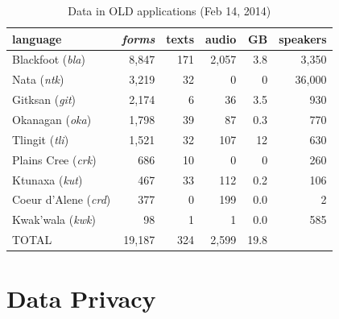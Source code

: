 \documentclass[11pt]{article}
\begin{document}
\begin{table}[h]
 \begin{center}
     \scriptsize
\begin{tabular}{lrrrrr}

      \toprule
      language &                     \emph{forms}  & texts & audio & GB   & speakers \\
      \midrule
      Blackfoot (\textit{bla}) &     8,847  & 171   & 2,057 & 3.8  & 3,350    \\ %
      Nata (\textit{ntk}) &          3,219  & 32    & 0     & 0    & 36,000   \\ %
      Gitksan (\textit{git}) &       2,174  & 6     & 36    & 3.5  & 930      \\ %
      Okanagan (\textit{oka}) &      1,798  & 39    & 87    & 0.3  & 770      \\ %
      Tlingit (\textit{tli}) &       1,521  & 32    & 107   & 12   & 630      \\ %
      Plains Cree (\textit{crk}) &   686    & 10    & 0     & 0    & 260      \\ %
      Ktunaxa (\textit{kut}) &       467    & 33    & 112   & 0.2  & 106      \\ %
      Coeur d'Alene (\textit{crd}) & 377    & 0     & 199   & 0.0  & 2        \\ %
      Kwak'wala (\textit{kwk}) &     98     & 1     & 1     & 0.0  & 585      \\ %
      TOTAL &                        19,187 & 324   & 2,599 & 19.8 &         \\ %
      \bottomrule

\end{tabular}
\caption{Data in OLD applications (Feb 14, 2014)}
\label{old-data}
 \end{center}
 \normalsize
\end{table}



\section{Data Privacy}
\label{privacy}
\end{document}
